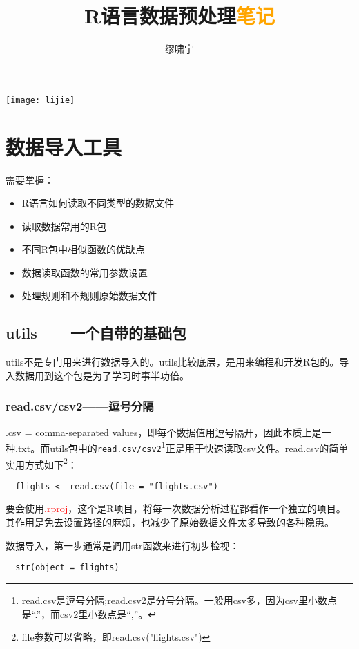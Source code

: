 \documentclass[cn,hazy,blue,14pt,screen]{elegantnote}
\title{R语言数据预处理\textcolor{orange}{笔记}}
\author{缪啸宇}
\institute{南航经管}
\date{\zhtoday}
\begin{document}
\maketitle

\centerline{
  \texttt{[image: lijie]}}

\newpage    %
\section{数据导入工具}
\noindent 需要掌握：
\begin{itemize}
    \item R语言如何读取不同类型的数据文件
    \item 读取数据常用的R包
    \item 不同R包中相似函数的优缺点
    \item 数据读取函数的常用参数设置
    \item 处理规则和不规则原始数据文件
\end{itemize}

\subsection{utils——一个自带的基础包}
utils不是专门用来进行数据导入的。utils比较底层，是用来编程和开发R包的。导入数据用到这个包是为了学习时事半功倍。

\subsubsection{read.csv/csv2——逗号分隔}
.csv = comma-separated values，即每个数据值用逗号隔开，因此本质上是一种.txt。而utils包中的\lstinline{read.csv/csv2}\footnote{read.csv是逗号分隔;read.csv2是分号分隔。一般用csv多，因为csv里小数点是“.”，而csv2里小数点是“,”。}正是用于快速读取csv文件。read.csv的简单实用方式如下\footnote{file参数可以省略，即read.csv("flights.csv")}：

\begin{lstlisting}
  flights <- read.csv(file = "flights.csv")
\end{lstlisting} 

要会使用\textcolor{red}{.rproj}，这个是R项目，将每一次数据分析过程都看作一个独立的项目。其作用是免去设置路径的麻烦，也减少了原始数据文件太多导致的各种隐患。

数据导入，第一步通常是调用str函数来进行初步检视：

\begin{lstlisting}
  str(object = flights)
\end{lstlisting} 
\end{document}
